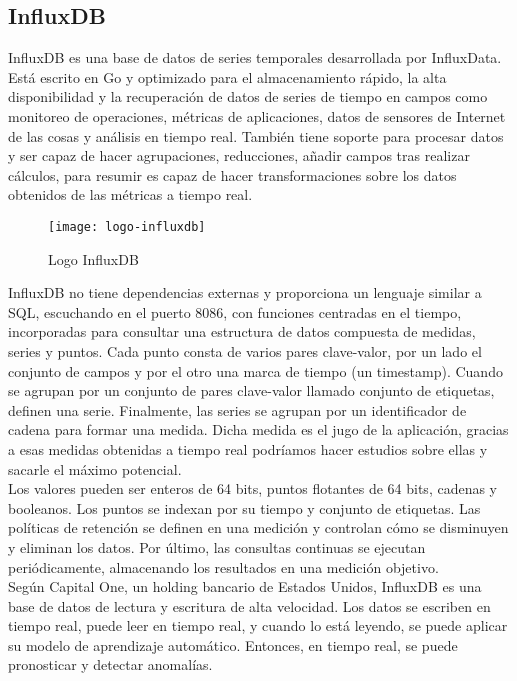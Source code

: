\documentclass[ spanish, a4paper, 12pt, oneside]{report}
\begin{document}
\subsection{InfluxDB}
InfluxDB es una base de datos de series temporales desarrollada por InfluxData. Está escrito en Go y optimizado para el almacenamiento rápido, la alta disponibilidad y la recuperación de datos de series de tiempo en campos como 
monitoreo de operaciones, métricas de aplicaciones, datos de sensores de Internet de las cosas y análisis en tiempo real. También tiene soporte para procesar datos y ser capaz de hacer agrupaciones, reducciones, añadir campos tras realizar cálculos, para resumir es capaz de 
hacer transformaciones sobre los datos obtenidos de las métricas a tiempo real. \\

\begin{figure}[!h]
   \centering
   \texttt{[image: logo-influxdb]}\\
      \caption{\label{fig: Logo InfluxDB} Logo InfluxDB}
\end{figure}

InfluxDB no tiene dependencias externas y proporciona un lenguaje similar a SQL, escuchando en el puerto 8086, con funciones centradas en el tiempo, incorporadas para consultar una estructura de datos compuesta de medidas, series y puntos. Cada punto consta de varios 
pares clave-valor, por un lado el conjunto de campos y por el otro una marca de tiempo (un timestamp). Cuando se agrupan por un conjunto de pares clave-valor llamado conjunto de etiquetas, definen una serie. Finalmente, las series se agrupan por un identificador de cadena para 
formar una medida. Dicha medida es el jugo de la aplicación, gracias a esas medidas obtenidas a tiempo real podríamos hacer estudios sobre ellas y sacarle el máximo potencial. \\

Los valores pueden ser enteros de 64 bits, puntos flotantes de 64 bits, cadenas y booleanos. Los puntos se indexan por su tiempo y conjunto de etiquetas. Las políticas de retención se definen en una medición y controlan cómo se 
disminuyen y eliminan los datos. Por último, las consultas continuas se ejecutan periódicamente, almacenando los resultados en una medición objetivo. \\

Según Capital One, un holding bancario de Estados Unidos, InfluxDB es una base de datos de lectura y escritura de alta velocidad. Los datos se escriben en tiempo real, puede leer en tiempo real, y cuando lo está leyendo, se puede aplicar su modelo de aprendizaje automático. 
Entonces, en tiempo real, se puede pronosticar y detectar anomalías. \\
\end{document}
